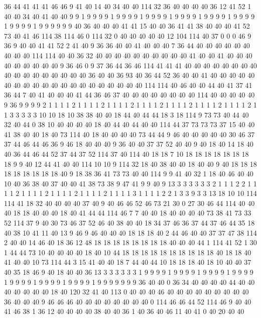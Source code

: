 36 44 41 41 41 46 46 9 41 40 14 40 34 40 40 114 32 36 40 40
40 40 36 12 41 52 1 40 40 34 40 41 40 40 9 9 1 9 9 9
9 1 9 9 9 9 1 9 9 9 9 1 9 9 9 9 1 9 9 9
9 1 9 9 9 9 1 9 9 9 9 1 9 9 9 9 9 9 40 36
40 40 40 41 41 15 40 40 36 41 41 38 40 40 40 41 52 73 40 41
46 114 38 114 46 0 114 32 0 40 40 40 40 40 12 104 114 40 37 0
0 0 46 9 36 9 40 40 41 41 52 2 41 40 9 36 36 40 40 41
40 40 40 7 36 44 40 40 40 40 40 40 40 40 40 114 114 40 40 36
32 40 40 40 40 40 40 40 40 40 40 41 40 40 41 40 40 40 40 40
40 40 40 40 9 36 46 0 9 37 36 44 36 46 114 41 41 41 40 40
40 40 40 40 40 40 40 40 40 40 40 40 40 40 40 36 40 40 36 93
40 36 44 52 36 40 40 41 40 40 40 40 40 40 40 40 40 40 40 40
40 40 40 40 40 40 40 40 114 114 40 46 40 40 44 40 41 37 41 36
44 7 40 41 40 40 40 41 44 36 46 37 40 40 40 40 40 40 40 40
114 40 40 40 40 40 9 36 9 9 9 9 2 1 1 1 1 2 1 1
1 1 2 1 1 1 1 2 1 1 1 1 2 1 1 1 1 2 1 1
1 1 2 1 1 1 1 2 1 1 3 3 3 3 3 10 10 18 10 38
38 40 40 18 44 40 44 44 18 3 18 114 9 73 73 40 44 40 32 40
44 0 38 10 40 40 40 40 18 40 44 40 44 40 40 114 44 37 73 73
73 37 15 40 40 41 38 40 40 18 40 73 114 40 18 40 40 40 40 73
44 44 9 46 40 40 40 40 40 30 46 37 37 44 46 44 46 36 9 46
18 40 40 40 9 36 40 40 37 37 52 40 40 9 40 18 40 14 18 40
40 36 44 46 44 52 37 44 37 52 114 37 40 114 40 18 18 7 10 18
18 18 18 18 18 18 18 9 9 40 12 44 41 40 40 114 10 10 9 114
32 18 40 38 40 40 18 40 40 9 40 18 18 18 18 18 18 18 18 18
40 9 18 38 36 41 73 73 40 40 114 9 9 41 40 32 1 18 40 46
40 40 10 40 36 38 40 37 40 40 41 38 73 38 9 47 41 9 9 40
9 13 3 3 3 3 3 3 2 1 1 1 2 2 1 1 1 1 2 1
1 1 1 2 1 1 1 1 2 1 1 1 1 2 1 1 1 1 3 1
1 1 1 2 2 1 3 3 9 3 3 13 18 10 10 114 114 41 18 32
40 40 40 40 37 40 9 40 46 46 52 46 73 21 30 0 27 30 46 44
114 40 40 40 18 18 40 40 40 18 40 41 44 44 114 46 7 7 40 40
18 40 40 40 40 73 38 41 73 33 52 114 37 9 40 30 73 46 37 52
46 40 38 40 40 18 34 37 46 36 37 44 37 46 44 35 18 40 38 10
41 11 40 13 9 46 9 46 40 40 40 18 18 18 40 2 44 46 40 40
37 37 47 38 114 2 40 40 14 46 40 18 36 12 48 18 18 18 18 18
18 18 18 40 40 40 44 1 114 41 52 1 30 1 44 44 73 10 40 40
40 40 18 40 10 44 18 18 18 18 18 18 18 18 18 18 40 18 18 40
41 40 40 10 73 114 44 3 15 41 40 40 18 7 44 40 44 10 18 18
18 40 18 10 40 40 37 40 35 18 46 9 40 18 40 40 36 13 3 3
3 3 3 3 1 9 9 9 9 1 9 9 9 9 1 9 9 9 9 1
9 9 9 9 1 9 9 9 9 1 9 9 9 9 1 9 9 9 9 1
9 9 9 9 9 9 9 36 40 40 0 36 34 40 40 40 40 44 40 40
40 40 40 40 40 18 40 120 32 41 40 113 0 40 40 40 46 40 40 40
40 40 40 40 40 40 36 40 40 40 9 46 46 46 40 40 40 40 40 40
40 40 0 114 46 46 44 52 114 46 9 40 40 41 46 38 1 36 12 40
40 40 40 38 40 40 36 1 40 36 40 46 11 40 41 0 40 20 40 40
